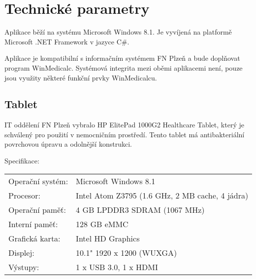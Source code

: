 \setlength{\parskip}{1em}

\chapter{Technické parametry}

Aplikace běží na systému Microsoft Windows 8.1. Je vyvíjená na platformě Microsoft .NET Framework v jazyce C#.

Aplikace je kompatibilní s informačním systémem FN Plzeň a bude doplňovat program WinMedicalc. Systémová integrita mezi oběmi aplikacemi není, pouze jsou využity některé funkční prvky WinMedicalcu.

\section{Tablet}

IT oddělení FN Plzeň vybralo HP ElitePad 1000G2 Healthcare Tablet, který je schválený pro použití v nemocničním prostředí. Tento tablet má antibakteriální povrchovou úpravu a odolnější konstrukci.

\noindent
Specifikace:

\noindent
\begin{tabular}{l l}
	Operační systém: & Microsoft Windows 8.1\\
	Procesor: & Intel Atom Z3795 (1.6 GHz, 2 MB cache, 4 jádra)\\
	Operační paměť: & 4 GB LPDDR3 SDRAM (1067 MHz)\\
	Interní paměť: & 128 GB eMMC\\
	Grafická karta: & Intel HD Graphics\\
	Displej: & 10.1" 1920 x 1200 (WUXGA)\\
	Výstupy: & 1 x USB 3.0, 1 x HDMI
\end{tabular}